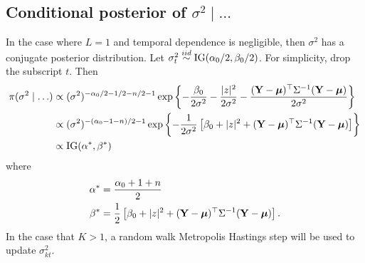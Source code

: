 \documentclass[useAMS,usenatbib,referee]{biomweb}
\begin{document}
\subsection*{Conditional posterior of $\sigma^2 \mid \ldots$}\label{sts:sigpost}
In the case where $L = 1$ and temporal dependence is negligible, then $\sigma^2$ has a conjugate posterior distribution.
Let $\sigma_t^2 \stackrel{iid}{\sim} \mbox{IG}(\alpha_0 / 2, \beta_0 / 2)$. For simplicity, drop the subscript $t$. Then
\begin{align*}
    \pi(\sigma^2 \mid \ldots) & \propto (\sigma^2)^{ -\alpha_0 / 2 - 1 / 2 - n / 2 - 1} \exp \left\{ -\frac{\beta_0}{2\sigma^2} - \frac{ |z|^2 }{2 \sigma^2} - \frac{ (\mbox{\bf Y} - \mbox{\boldmath $\mu$})^\top \Sigma^{-1} (\mbox{\bf Y} - \mbox{\boldmath $\mu$}) }{2 \sigma^2} \right\} \\
    & \propto (\sigma^2)^{ -(\alpha_0 - 1 - n) / 2 - 1} \exp \left\{ - \frac{ 1 }{ 2 \sigma^2 } \left[\beta_0 + |z|^2 + (\mbox{\bf Y} - \mbox{\boldmath $\mu$})^\top \Sigma^{-1} (\mbox{\bf Y} - \mbox{\boldmath $\mu$}) \right] \right\} \\
    & \propto \mbox{IG} (\alpha^*, \beta^*)
\end{align*}
where
\begin{align*}
    \alpha^* &= \frac{\alpha_0 + 1 + n}{2} \\
    \beta^* &= \frac{1}{2} \left[ \beta_0 + |z|^2 + (\mbox{\bf Y} - \mbox{\boldmath $\mu$})^\top \Sigma^{-1} (\mbox{\bf Y} - \mbox{\boldmath $\mu$}) \right].
\end{align*}
In the case that $K > 1$, a random walk Metropolis Hastings step will be used to update $\sigma^2_{kt}$.
\end{document}
